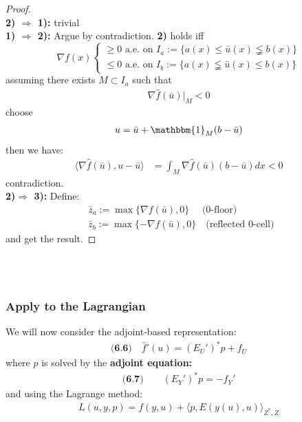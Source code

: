 \documentclass[a4paper,11pt,fleqn]{book}
\theoremstyle{definition}
\theoremstyle{remark}
\begin{document}
\begin{proof}
\quad\\
\textbf{2) $\Rightarrow$ 1):} trivial\\
\textbf{1) $\Rightarrow$ 2):} Argue by contradiction. \textbf{2)} holds iff
\begin{equation*}
\nabla f(x)\left\{
\begin{aligned}
	\ge 0 \text{ a.e. on  } I_a := \{a(x) \le \bar{u}(x) \lneqq b(x)\}\\
	\le 0 \text{ a.e. on  } I_b := \{a(x) \lneqq \bar{u}(x) \le b(x) \}
\end{aligned}
\right.	
\end{equation*}
assuming there exists $M \subset I_a$ such that 
\begin{align*}
	\nabla \hat{f}(\bar{u})|_M <  0
\end{align*}
choose 
\begin{align*}
	u = \bar{u} + \mathbbm{1}_{M}(b - \bar{u})
\end{align*}
then we have:
\begin{align*}
	\langle \nabla \hat{f}(\bar{u}), u - \bar{u} \rangle 
	&= \int_M \nabla \hat{f} (\bar{u})(b - \bar{u}) dx < 0
\end{align*}
contradiction. \\
\textbf{2)$\Rightarrow$ 3):} Define:
\begin{align*}
	&\bar{z}_a:= \max\{\nabla f(\bar{u}), 0 \}\quad \text{ (0-floor)} \\
	&\bar{z}_b:= \max\{-\nabla f(\bar{u}), 0\}\quad \text{(reflected 0-cell) }
\end{align*}
and get the result. 
\end{proof}

\quad\\
\quad\\
\subsubsection*{Apply to the Lagrangian}
We will now consider the adjoint-based representation: 
\begin{align*}
\textbf{(6.6)} \quad
	\hat{f}'(u) = (E_U')^* p + f_U
\end{align*}
where $p$ is solved by the \textbf{adjoint equation:} 
\begin{align*}
\textbf{(6.7)}
\qquad
	(E_Y')^* p = -f_Y'
\end{align*}
and using the Lagrange method:
\begin{align*}
	L(u, y, p) = f(y, u) + \langle p, E(y(u), u) \rangle_{Z^*, Z}
\end{align*}
\end{document}
